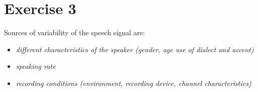 \section*{Exercise 3} %
\label{sec:a}

Sources of variability of the speech signal are:
\begin{itemize}
	\item \emph{different characteristics of the speaker (gender, age use of dialect and accent)}
	\item \emph{speaking rate}
	\item \emph{recording conditions (environment, recording device, channel characteristics)}
\end{itemize}
 
